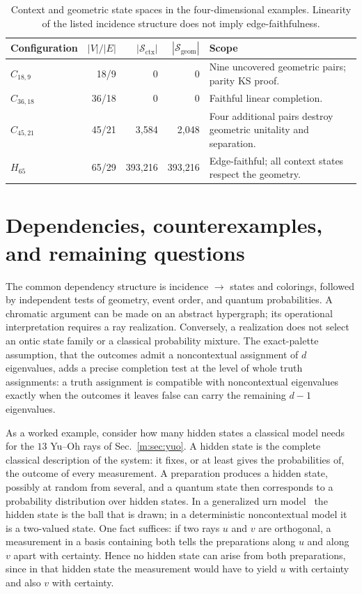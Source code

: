 \documentclass[aps,pra,reprint,superscriptaddress,longbibliography,nofootinbib,floatfix,10pt]{revtex4-2}
\theoremstyle{definition}\newtheorem{definition}[theorem]{Definition}
\theoremstyle{remark}\newtheorem{remark}[theorem]{Remark}
\newcommand{\Sc}{\mathcal S}\newcommand{\Cc}{\mathcal C}
\begin{document}
\begin{table}[t]
\centering\small\setlength{\tabcolsep}{3pt}
\caption{Context and geometric state spaces in the four-dimensional examples. Linearity of the listed incidence structure does not imply edge-faithfulness.}\label{tab:cabello-state-comparison}
\begin{tabular}{p{}rrrp{}}\toprule
Configuration & $|V|/|E|$ & $|\Sc_{\mathrm{ctx}}|$ & $|\Sc_{\mathrm{geom}}|$ & Scope\\\midrule
$C_{18,9}$ & 18/9 & 0 & 0 & Nine uncovered geometric pairs; parity KS proof.\\
$C_{36,18}$ & 36/18 & 0 & 0 & Faithful linear completion.\\
$C_{45,21}$ & 45/21 & 3,584 & 2,048 & Four additional pairs destroy geometric unitality and separation.\\
$H_{65}$ & 65/29 & 393,216 & 393,216 & Edge-faithful; all context states respect the geometry.\\
\bottomrule\end{tabular}
\end{table}


\section{Dependencies, counterexamples, and remaining questions}\label{sec:open}
The common dependency structure is incidence $\to$ states and colorings, followed by independent tests of geometry, event order, and quantum probabilities. A chromatic argument can be made on an abstract hypergraph; its operational interpretation requires a ray realization. Conversely, a realization does not select an ontic state family or a classical probability mixture. The exact-palette assumption, that the outcomes admit a noncontextual assignment of $d$ eigenvalues, adds a precise completion test at the level of whole truth assignments: a truth assignment is compatible with noncontextual eigenvalues exactly when the outcomes it leaves false can carry the remaining $d-1$ eigenvalues.

As a worked example, consider how many hidden states a classical model needs for the $13$ Yu--Oh rays of Sec.~\ref{m:sec:yuo}. A hidden state is the complete classical description of the system: it fixes, or at least gives the probabilities of, the outcome of every measurement. A preparation produces a hidden state, possibly at random from several, and a quantum state then corresponds to a probability distribution over hidden states. In a generalized urn model~\cite{svozil-2001-eua} the hidden state is the ball that is drawn; in a deterministic noncontextual model it is a two-valued state. One fact suffices: if two rays $u$ and $v$ are orthogonal, a measurement in a basis containing both tells the preparations along $u$ and along $v$ apart with certainty. Hence no hidden state can arise from both preparations, since in that hidden state the measurement would have to yield $u$ with certainty and also $v$ with certainty.
\end{document}
